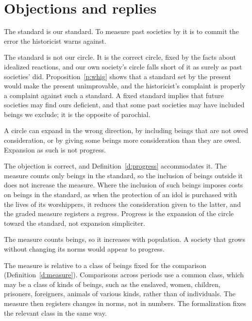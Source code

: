 \documentclass{situationist-preprint}
\begin{document}
\section{Objections and replies}

\begin{objection}[Parochialism]
The standard is our standard. To measure past societies by it is to commit the error the historicist warns against.
\end{objection}

\begin{reply}
The standard is not our circle. It is the correct circle, fixed by the facts about idealized reactions, and our own society's circle falls short of it as surely as past societies' did. Proposition~\ref{p:whig} shows that a standard set by the present would make the present unimprovable, and the historicist's complaint is properly a complaint against such a standard. A fixed standard implies that future societies may find ours deficient, and that some past societies may have included beings we exclude; it is the opposite of parochial.
\end{reply}

\begin{objection}[Overextension]
A circle can expand in the wrong direction, by including beings that are not owed consideration, or by giving some beings more consideration than they are owed. Expansion as such is not progress.
\end{objection}

\begin{reply}
The objection is correct, and Definition~\ref{d:progress} accommodates it. The measure counts only beings in the standard, so the inclusion of beings outside it does not increase the measure. Where the inclusion of such beings imposes costs on beings in the standard, as when the protection of an idol is purchased with the lives of its worshippers, it reduces the consideration given to the latter, and the graded measure registers a regress. Progress is the expansion of the circle toward the standard, not expansion simpliciter.
\end{reply}

\begin{objection}[Population]
The measure counts beings, so it increases with population. A society that grows without changing its norms would appear to progress.
\end{objection}

\begin{reply}
The measure is relative to a class of beings fixed for the comparison (Definition~\ref{d:measure}). Comparisons across periods use a common class, which may be a class of kinds of beings, such as the enslaved, women, children, prisoners, foreigners, animals of various kinds, rather than of individuals. The measure then registers changes in norms, not in numbers. The formalization fixes the relevant class in the same way.
\end{reply}
\end{document}
